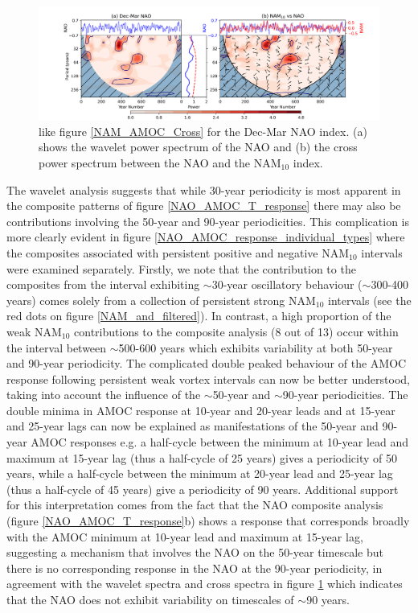 \begin{figure}[h!]
\begin{center}
\noindent\includegraphics[width = \linewidth]{Figures/Figures-surface/NAM_NAO_filtered_subplot.png}
\caption[Wavelet power spectrum of the NAO]{like figure \ref{NAM_AMOC_Cross} for the Dec-Mar NAO index. (a) shows the wavelet power spectrum of the NAO and (b) the cross power spectrum between the NAO and the NAM$_{10}$ index.}
\label{NAO_NAM_Cross}
\end{center}
\end{figure}

The wavelet analysis suggests that while 30-year periodicity is most apparent in the composite patterns of figure \ref{NAO_AMOC_T_response} there may also be contributions involving the 50-year and 90-year periodicities. This complication is more clearly evident in figure \ref{NAO_AMOC_response_individual_types} where the composites associated with persistent positive and negative NAM$_{10}$ intervals were examined separately. Firstly, we note that the contribution to the composites from the interval exhibiting $\sim$30-year oscillatory behaviour ($\sim$300-400 years) comes solely from a collection of persistent strong NAM$_{10}$ intervals (see the red dots on figure \ref{NAM_and_filtered}). In contrast, a high proportion of the weak NAM$_{10}$ contributions to the composite analysis (8 out of 13) occur within the interval between $\sim$500-600 years which exhibits variability at both 50-year and 90-year periodicity. The complicated double peaked behaviour of the AMOC response following persistent weak vortex intervals can now be better understood, taking into account the influence of the $\sim$50-year and $\sim$90-year periodicities. The double minima in AMOC response at 10-year and 20-year leads and at 15-year and 25-year lags can now be explained as manifestations of the 50-year and 90-year AMOC responses e.g. a half-cycle between the minimum at 10-year lead and maximum at 15-year lag (thus a half-cycle of 25 years) gives a periodicity of 50 years, while a half-cycle between the minimum at 20-year lead and 25-year lag (thus a half-cycle of 45 years) give a periodicity of 90 years. Additional support for this interpretation comes from the fact that the NAO composite analysis (figure \ref{NAO_AMOC_T_response}b) shows a response that corresponds broadly with the AMOC minimum at 10-year lead and maximum at 15-year lag, suggesting a mechanism that involves the NAO on the 50-year timescale but there is no corresponding response in the NAO at the 90-year periodicity, in agreement with  the wavelet spectra and cross spectra in figure \ref{NAO_NAM_Cross} which indicates that the NAO does not exhibit variability on timescales of $\sim$90 years. 

